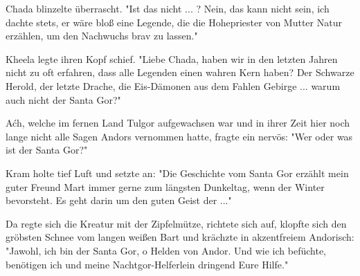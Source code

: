 \documentclass[10pt, a4paper, oneside]{book}
\begin{document}
Chada blinzelte überrascht. "Ist das nicht ... ? Nein, das kann nicht sein, ich dachte stets, er wäre bloß eine Legende, die die Hohepriester von Mutter Natur erzählen, um den Nachwuchs brav zu lassen."

Kheela legte ihren Kopf schief. "Liebe Chada, haben wir in den letzten Jahren nicht zu oft erfahren, dass alle Legenden einen wahren Kern haben? Der Schwarze Herold, der letzte Drache, die Eis-Dämonen aus dem Fahlen Gebirge ... warum auch nicht der Santa Gor?"

Aćh, welche im fernen Land Tulgor aufgewachsen war und in ihrer Zeit hier noch lange nicht alle Sagen Andors vernommen hatte, fragte ein nervös: "Wer oder was ist der Santa Gor?"

Kram holte tief Luft und setzte an: "Die Geschichte vom Santa Gor erzählt mein guter Freund Mart immer gerne zum längsten Dunkeltag, wenn der Winter bevorsteht. Es geht darin um den guten Geist der ..."

Da regte sich die Kreatur mit der Zipfelmütze, richtete sich auf, klopfte sich den gröbsten Schnee vom langen weißen Bart und krächzte in akzentfreiem Andorisch: "Jawohl, ich bin der Santa Gor, o Helden von Andor. Und wie ich befüchte, benötigen ich und meine Nachtgor-Helferlein dringend Eure Hilfe."




\end{document}
